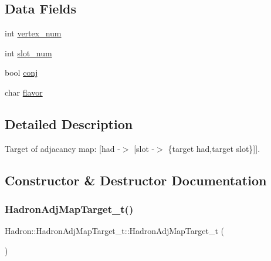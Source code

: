 \subsection*{Data Fields}
\begin{DoxyCompactItemize}
\item 
int \mbox{\hyperlink{structHadron_1_1HadronAdjMapTarget__t_a591e79f978fc68efa83b729d13e6872c}{vertex\+\_\+num}}
\item 
int \mbox{\hyperlink{structHadron_1_1HadronAdjMapTarget__t_a59cc83d2da52e974a06d4ae8dc8b1468}{slot\+\_\+num}}
\item 
bool \mbox{\hyperlink{structHadron_1_1HadronAdjMapTarget__t_ab0dc7d35e65a5bf062eebe45f56ca135}{conj}}
\item 
char \mbox{\hyperlink{structHadron_1_1HadronAdjMapTarget__t_a649624915499cdf922a11d0df23e1aa0}{flavor}}
\end{DoxyCompactItemize}


\subsection{Detailed Description}
Target of adjacancy map\+: \mbox{[}had -\/$>$ \mbox{[}slot -\/$>$ \{target had,target slot\}\mbox{]}\mbox{]}. 

\subsection{Constructor \& Destructor Documentation}
\mbox{\label{structHadron_1_1HadronAdjMapTarget__t_a63044628e349d5fdd35356c36d3e2bf3}} 
\subsubsection{\texorpdfstring{HadronAdjMapTarget\_t()}{HadronAdjMapTarget\_t()}\hspace{0.1cm}{\footnotesize\ttfamily [1/6]}}
{\footnotesize\ttfamily Hadron\+::\+Hadron\+Adj\+Map\+Target\+\_\+t\+::\+Hadron\+Adj\+Map\+Target\+\_\+t (\begin{DoxyParamCaption}{ }\end{DoxyParamCaption})\hspace{0.3cm}{\ttfamily [inline]}}

